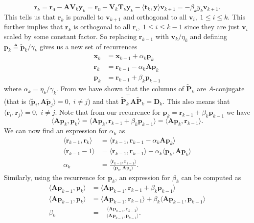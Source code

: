 \[
    \bm{r}_k = \bm{r}_0 - \bm{A} \bm{V}_{k} \bm{y}_k = \bm{r}_0 - \bm{V}_{k} \bm{T}_k \bm{y}_k - \langle \bm{t}_k , \bm{y} \rangle \bm{v}_{k+1} = - \beta_k y_k \bm{v}_{k+1}.
\]
This tells us that $\bm{r}_k$ is parallel to $\bm{v}_{k+1}$ and orthogonal to all $\bm{v}_{i}, \; 1 \leq i \leq k$. This further implies that $\bm{r}_k$ is orthogonal to all $\bm{r}_i, \; 1 \leq i \leq k-1$ since they are just $\bm{v}_{i}$ scaled by some constant factor. So replacing $\bm{r}_{k-1}$ with $\bm{v}_k / \eta_k$ and defining $\bm{p}_k \triangleq \tilde{\bm{p}}_k / \gamma_k$ gives us a new set of recurrences
\begin{align*}
    \bm{x}_k & = \bm{x}_{k-1} + \alpha_k \bm{p}_k        \\
    \bm{r}_k & = \bm{r}_{k-1} - \alpha_k \bm{A} \bm{p}_k \\
    \bm{p}_k & = \bm{r}_{k-1} + \beta_k \bm{p}_{k-1}
\end{align*}
where $\alpha_k = \eta_k / \gamma_k$. From  we have shown that the columns of $\tilde{\bm{P}}_k$ are $A$-conjugate (that is $\langle \tilde{\bm{p}}_i , \bm{A} \tilde{\bm{p}}_j \rangle = 0, \; i \neq j$) and that $\tilde{\bm{P}}_k^{\intercal} \bm{A} \tilde{\bm{P}}_k = \bm{D}_k$. This also means that $\langle \bm{r}_i , \bm{r}_j \rangle = 0, \; i \neq j$. Note that from our recurrence for $\bm{p}_k = \bm{r}_{k-1} + \beta_k \bm{p}_{k-1}$ we have
\[
    \langle \bm{A} \bm{p}_k ,\bm{p}_k \rangle = \langle \bm{A} \bm{p}_k , \bm{r}_{k-1} + \beta_k \bm{p}_{k-1} \rangle = \langle \bm{A} \bm{p}_k , \bm{r}_{k-1} \rangle.
\]
We can now find an expression for $\alpha_k$ as
\begin{align*}
    \langle \bm{r}_{k-1} , \bm{r}_{k} \rangle & = \langle \bm{r}_{k-1} , \bm{r}_{k-1} - \alpha_k \bm{A} \bm{p}_k \rangle                           \\
    \langle \bm{r}_{k-1} -1 \rangle           & = \langle \bm{r}_{k-1} , \bm{r}_{k-1} \rangle - \alpha_k \langle \bm{p}_k, \bm{A} \bm{p}_k \rangle \\
    \alpha_k                                  & = \frac{\langle \bm{r}_{k-1} , \bm{r}_{k-1} \rangle}{\langle \bm{p}_k, \bm{A} \bm{p}_k \rangle}.
\end{align*}
Similarly, using the recurrence for $\bm{p}_k$, an expression for $\beta_k$ can be computed as
\begin{align*}
    \langle \bm{A} \bm{p}_{k-1} , \bm{p}_k \rangle & = \langle \bm{A} \bm{p}_{k-1}, \bm{r}_{k-1} + \beta_k \bm{p}_{k-1} \rangle                                       \\
    \langle \bm{A} \bm{p}_{k-1} , \bm{p}_k \rangle & = \langle \bm{A} \bm{p}_{k-1}, \bm{r}_{k-1} \rangle + \beta_k \langle \bm{A} \bm{p}_{k-1}, \bm{p}_{k-1} \rangle  \\
    \beta_k                                        & = - \frac{\langle \bm{A} \bm{p}_{k-1}, \bm{r}_{k-1} \rangle}{\langle \bm{A} \bm{p}_{k-1}, \bm{p}_{k-1} \rangle}.
\end{align*}
